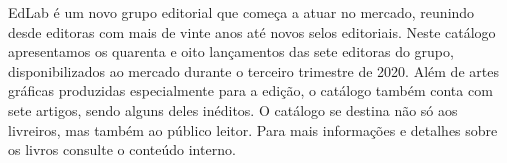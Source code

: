 \blankpage
\pagestyle{indice}

{}

\vspace{2.2cm}

{}


\hspace*{-7cm}\hrulefill\hspace*{-7cm}

\vspace{1cm}

\hspace*{-.5cm}\parbox{180pt}{\raggedright EdLab é um novo grupo editorial que começa a atuar no mercado, reunindo desde editoras com mais de vinte anos até novos selos editoriais. Neste catálogo apresentamos os quarenta e oito lançamentos das sete editoras do grupo, disponibilizados ao mercado durante o terceiro trimestre de 2020. Além de artes gráficas produzidas especialmente para a edição, o catálogo também conta com sete artigos, sendo alguns deles inéditos. O catálogo se destina não só aos livreiros, mas também ao público leitor. Para mais informações e detalhes sobre os livros consulte o conteúdo interno. } %

